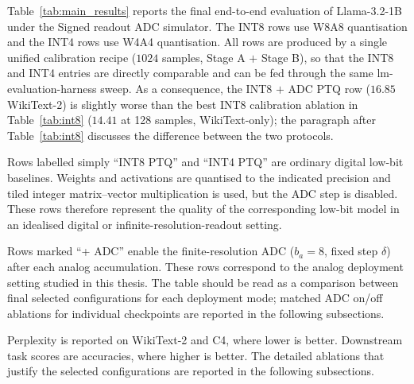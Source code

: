 \documentclass[a4paper,11pt,oneside]{article}
\theoremstyle{breakstyle}
\begin{document}
  Table~\ref{tab:main_results} reports the final end-to-end evaluation
  of Llama-3.2-1B under the Signed readout ADC simulator.  The INT8 rows use
  W8A8 quantisation and the INT4 rows use W4A4 quantisation.  All rows
  are produced by a single unified calibration recipe ($1024$ samples,
  Stage A $+$ Stage B), so that the INT8 and INT4 entries are directly
  comparable and can be fed through the same lm-evaluation-harness
  sweep.  As a consequence, the INT8 $+$ ADC PTQ row ($16.85$
  WikiText-2) is slightly worse than the best INT8 calibration
  ablation in Table~\ref{tab:int8} ($14.41$ at 128 samples,
  WikiText-only); the paragraph after Table~\ref{tab:int8} discusses
  the difference between the two protocols.

  Rows labelled simply ``INT8 PTQ'' and ``INT4 PTQ'' are ordinary
  digital low-bit baselines.  Weights and activations are quantised to
  the indicated precision and tiled integer matrix--vector multiplication
  is used, but the ADC step is disabled.  These rows therefore represent
  the quality of the corresponding low-bit model in an idealised digital
  or infinite-resolution-readout setting.

  Rows marked ``+ ADC'' enable the finite-resolution ADC
  ($b_a = 8$, fixed step $\delta$) after each analog accumulation.  These
  rows correspond to the analog deployment setting studied in this
  thesis.  The table should be read as a comparison between final
  selected configurations for each deployment mode; matched ADC on/off
  ablations for individual checkpoints are reported in the following
  subsections.

  Perplexity is reported on WikiText-2 and C4, where lower is better.
  Downstream task scores are accuracies, where higher is
  better.  The detailed ablations that justify the selected
  configurations are reported in the following subsections.
\end{document}
